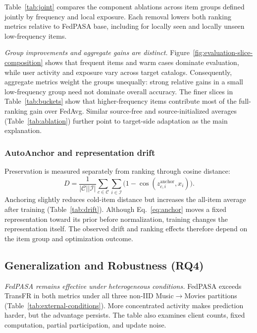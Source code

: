 Table~\ref{tab:joint} compares the component ablations across item groups defined jointly by frequency and local exposure. Each removal lowers both ranking metrics relative to FedPASA base, including for locally seen and locally unseen low-frequency items.

\noindent\textit{Group improvements and aggregate gains are distinct.}
Figure~\ref{fig:evaluation-slice-composition} shows that frequent items and warm cases dominate evaluation, while user activity and exposure vary across target catalogs. Consequently, aggregate metrics weight the groups unequally: strong relative gains in a small low-frequency group need not dominate overall accuracy. The finer slices in Table~\ref{tab:buckets} show that higher-frequency items contribute most of the full-ranking gain over FedAvg. Similar source-free and source-initialized averages (Table~\ref{tab:ablation}) further point to target-side adaptation as the main explanation.

\subsubsection{AutoAnchor and representation drift}
\label{sec:exp-anchor}\label{sec:exp-drift}
Preservation is measured separately from ranking through cosine distance:
\begin{equation}
D=\frac{1}{|\mathcal C||\mathcal I|}\sum_{c\in\mathcal C}\sum_{i\in\mathcal I}
\big(1-\cos(z^{\mathrm{anchor}}_{c,i},x_i)\big).
\end{equation}
Anchoring slightly reduces cold-item distance but increases the all-item average after training (Table~\ref{tab:drift}). Although Eq.~\eqref{eq:anchor} moves a fixed representation toward its prior before normalization, training changes the representation itself. The observed drift and ranking effects therefore depend on the item group and optimization outcome.

\subsection{Generalization and Robustness (RQ4)}
\label{sec:exp-robust}\label{sec:exp-noniid}







\noindent\textit{FedPASA remains effective under heterogeneous conditions.}
FedPASA exceeds TransFR in both metrics under all three non-IID Music$\to$Movies partitions (Table~\ref{tab:external-conditions}). More concentrated activity makes prediction harder, but the advantage persists. The table also examines client counts, fixed computation, partial participation, and update noise.

